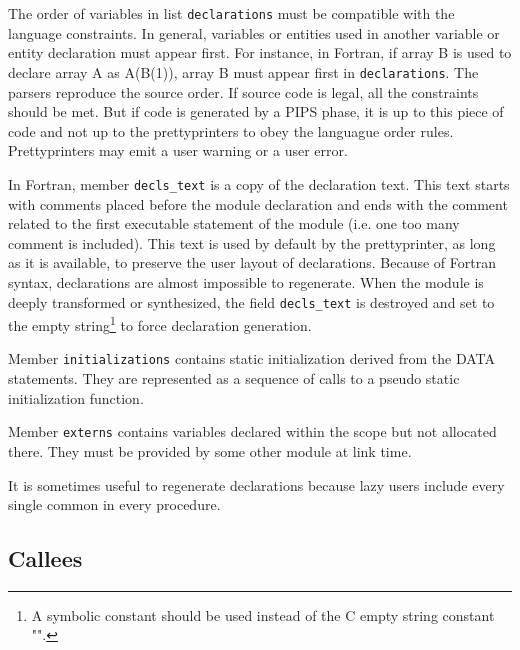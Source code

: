\documentclass[a4paper]{article}
\begin{document}
The order of variables in list \texttt{declarations} must be
compatible with the language constraints. In general, variables or
entities used in another variable or entity declaration must appear
first. For instance, in Fortran, if array B is used to declare array A
as A(B(1)), array B must appear first in \texttt{declarations}. The
parsers reproduce the source order. If source code is legal, all the
constraints should be met. But if code is generated by a PIPS phase,
it is up to this piece of code and not up to the prettyprinters to
obey the languague order rules. Prettyprinters may emit a user warning
or a user error.

In Fortran, member \verb/decls_text/ is a copy of the declaration text. This text
starts with comments placed before the module declaration and ends with
the comment related to the first executable statement of the module
(i.e. one too many comment is included). This text is used by default by
the prettyprinter, as long as it is available, to preserve the user
layout of declarations. Because of Fortran syntax, declarations are
almost impossible to regenerate. When the module is deeply transformed
or synthesized, the field \verb/decls_text/ is destroyed and set to the
empty string\footnote{A symbolic constant should be used instead of the
C empty string constant "".} to force declaration generation.

Member \texttt{initializations} contains static initialization derived from
the DATA statements. They are represented as a sequence of calls to a
pseudo static initialization function.

Member \texttt{externs} contains variables declared within the scope but
not allocated there. They must be provided by some other module at link time.

It is sometimes useful to regenerate declarations because lazy users
include every single common in every procedure.

\begin{comment}
Le sous-domaine \texttt{decls\_text} contient le texte exact de toutes les
d�clarations du module; ce texte est utilis� par d�faut par le
prettyprinter tant qu'il existe. Quand le code a �t� fortement
transform�, le prettyprinter r�g�n�re des d�clarations
synth�tiques.
\end{comment}

\subsection{Callees}
\label{subsection-callees}
\end{document}
